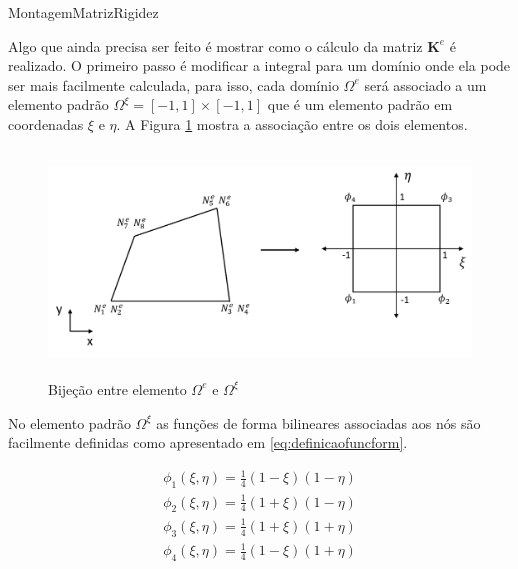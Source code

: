 \vspace{1cm}
\begin{algorithm}[H]
\caption{MontagemMatrizRigidez}
\label{alg:buildmatrix}

\end{algorithm}
\vspace{1cm}



Algo que ainda precisa ser feito é mostrar como o cálculo da matriz $\mathbf{K}^e$ é realizado. O primeiro passo é modificar a integral para um domínio onde ela pode ser mais facilmente calculada, para isso, cada domínio $\Omega^e$ será associado a um elemento padrão  $\Omega^\xi = [-1,1]\times[-1,1]$ que é um elemento padrão em coordenadas $\xi$ e $\eta$. A Figura \ref{fig:bijecaoelemento} mostra a associação entre os dois elementos.


\begin{figure}[!htbp]
\centering
\includegraphics[height=6cm]{chap01/figs/elementopadrao.png}
\caption{Bijeção entre elemento $\Omega^e$ e $\Omega^\xi$}
\label{fig:bijecaoelemento}
\end{figure}


No elemento padrão $\Omega^\xi$ as funções de forma bilineares associadas aos nós são facilmente definidas como apresentado em \eqref{eq:definicaofuncform}.


\begin{equation}
\begin{matrix}\label{eq:definicaofuncform}
\phi_1(\xi, \eta) = \frac{1}{4} (1-\xi)(1-\eta) \\
\phi_2(\xi, \eta) = \frac{1}{4} (1+\xi)(1-\eta) \\
\phi_3(\xi, \eta) = \frac{1}{4} (1+\xi)(1+\eta) \\
\phi_4(\xi, \eta) = \frac{1}{4} (1-\xi)(1+\eta) \\
\end{matrix}
\end{equation}


